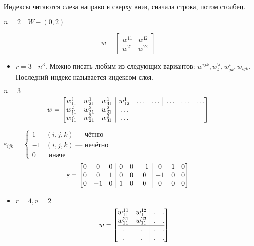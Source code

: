 Индексы читаются слева направо и сверху вниз, сначала строка, потом столбец.

\begin{example}
    \(n=2\quad W-(0, 2)\)

    \[w=\begin{bmatrix}
        w^{11} & w^{12} \\
        w^{21} & w^{22}
    \end{bmatrix}\]
\end{example}

\begin{itemize}
    \item \(r=3\quad n^3\). Можно писать любым из следующих вариантов: $w^{ijk}, w^{ij}_k, w^{i}_{jk}, w_{ijk}$. Последний индекс называется индексом слоя.
\end{itemize}

\begin{example}
    \(n=3\)
    \[w=
    \left[
    \begin{array}{@{}ccc|ccc|ccc@{}}
        w^{1}_{11} & w^{1}_{21} & w^{1}_{31} & w^{1}_{12} & \ldots &\ldots&\ldots&\ldots&\ldots\\
        w^{2}_{11} & w^{2}_{21} & w^{2}_{31} & \ldots \\
        w^{3}_{11} & w^{3}_{21} & w^{3}_{31} & \ldots \\
    \end{array}
    \right]
    \]
\end{example}
\begin{example}
    \(\varepsilon_{ijk}=\begin{cases}
        1 & (i, j, k) \text{ --- чётню} \\
        -1 & (i, j, k) \text{ --- нечётно} \\
        0 & \text{ иначе}
    \end{cases}\)
    \[\varepsilon=
    \left[
    \begin{array}{@{}ccc|ccc|ccc@{}}
        0&0&0&0&0&-1&0&1&0\\
        0&0&1&0&0&0&-1&0&0\\
        0&-1&0&1&0&0&0&0&0\\
    \end{array}
    \right]
    \]
\end{example}

\begin{itemize}
    \item \(r=4, n=2\)
    \[w=
    \left[
    \begin{array}{@{}cc|cc@{}}
        w_{11}^{11} & w_{11}^{12} &.&. \\
        w_{11}^{21} & w_{11}^{22} &.&. \\
        \hline
        .&.&.&.\\
        .&.&.&.\\
    \end{array}
    \right]
    \]
\end{itemize}

